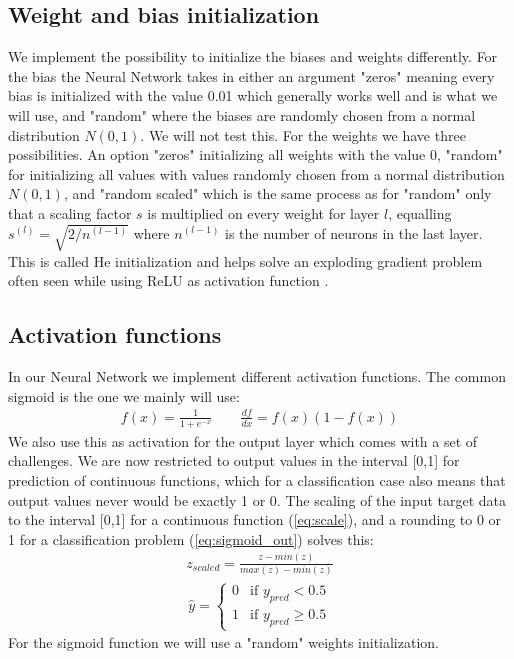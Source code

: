 \documentclass[11pt]{article}
\begin{document}
\subsection{Weight and bias initialization}
We implement the possibility to initialize the biases and weights differently. For the bias the Neural Network takes in either an argument "zeros" meaning every bias is initialized with the value 0.01 which generally works well  \cite{bias} and is what we will use, and "random" where the biases are randomly chosen from a normal distribution $N(0,1)$. We will not test this. For the weights we have three possibilities. An option "zeros" initializing all weights with the value 0, "random" for initializing all values with values randomly chosen from a normal distribution $N(0,1)$, and "random scaled" which is the same process as for "random" only that a scaling factor $s$ is multiplied on every weight for layer $l$, equalling $s^{(l)}=\sqrt{2/n^{(l-1)}}$ where $n^{(l-1)}$ is the number of neurons in the last layer. This is called He initialization and helps solve an exploding gradient problem often seen while using ReLU as activation function \cite{he}\cite{he_2}.

\subsection{Activation functions}
In our Neural Network we implement different activation functions. The common sigmoid is the one we mainly will use:
\begin{align*}
    f(x) = \frac{1 }{1 + e^{-x}} \quad\quad \frac{d f }{dx} = f(x) (1 - f(x))
\end{align*}
We also use this as activation for the output layer which comes with a set of challenges. We are now restricted to output values in the interval [0,1] for prediction of continuous functions, which for a classification case also means that output values never would be exactly 1 or 0. The scaling of the input target data to the interval [0,1] for a continuous function (\ref{eq:scale}), and a rounding to 0 or 1 for a classification problem (\ref{eq:sigmoid_out}) solves this:
\begin{align}
    \label{eq:scale}
    z_{scaled} = \frac{z- min(z)}{max(z)- min(z)}
\end{align}
\begin{align}
    \label{eq:sigmoid_out}
    \hat{y} =
    \begin{cases}
        0 & \text{if } y_{pred} < 0.5    \\
        1 & \text{if } y_{pred} \geq 0.5
    \end{cases}
\end{align}
For the sigmoid function we will use a "random" weights initialization.
\end{document}
